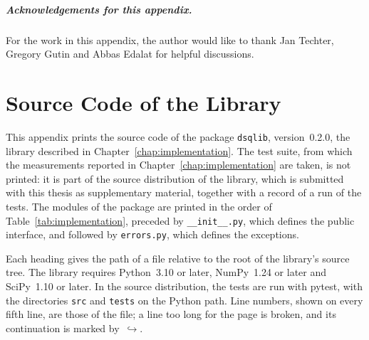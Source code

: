 \documentclass[12pt, a4paper]{report}
\theoremstyle{plain}
\theoremstyle{definition}
\theoremstyle{remark}
\theoremstyle{plain}
\begin{document}
\paragraph{Acknowledgements for this appendix.} For the work in this appendix, the author would like to thank Jan Techter, Gregory Gutin and Abbas Edalat for helpful discussions.
\chapter{Source Code of the Library}
\label{chap:code}

This appendix prints the source code of the package \texttt{dsqlib}, version~0.2.0, the library described in Chapter~\ref{chap:implementation}. The test suite, from which the measurements reported in Chapter~\ref{chap:implementation} are taken, is not printed: it is part of the source distribution of the library, which is submitted with this thesis as supplementary material, together with a record of a run of the tests. The modules of the package are printed in the order of Table~\ref{tab:implementation}, preceded by \texttt{\_\_init\_\_.py}, which defines the public interface, and followed by \texttt{errors.py}, which defines the exceptions.

Each heading gives the path of a file relative to the root of the library's source tree. The library requires Python~3.10 or later, NumPy~1.24 or later and SciPy~1.10 or later. In the source distribution, the tests are run with pytest, with the directories \texttt{src} and \texttt{tests} on the Python path. Line numbers, shown on every fifth line, are those of the file; a line too long for the page is broken, and its continuation is marked by~$\hookrightarrow$.
\end{document}
